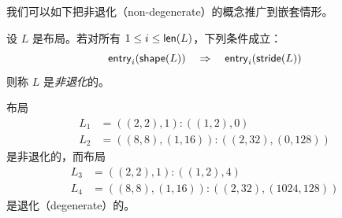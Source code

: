 我们可以如下把非退化（non-degenerate）的概念推广到嵌套情形。

\begin{definition}\label{definitionofnondegeneratelayout}
    设 $L$ 是布局。若对所有 $1 \leq i\leq \mathsf{len}(L)$，下列条件成立：
    \[
    \mathsf{entry}_i(\mathsf{shape}(L)) \quad \Rightarrow \quad \mathsf{entry}_i(\mathsf{stride}(L))
    \]
    则称 $L$ 是{\it 非退化}的。
\end{definition}

\begin{example}
    布局
    \begin{align*}
        L_1 & = ((2,2),1):((1,2),0)\\
        L_2 & = ((8,8),(1,16)):((2,32),(0,128))
    \end{align*}
    是非退化的，而布局
    \begin{align*}
        L_3 & = ((2,2),1):((1,2),4)\\
        L_4 & = ((8,8),(1,16)):((2,32),(1024,128))
    \end{align*}
    是退化（degenerate）的。
\end{example}





